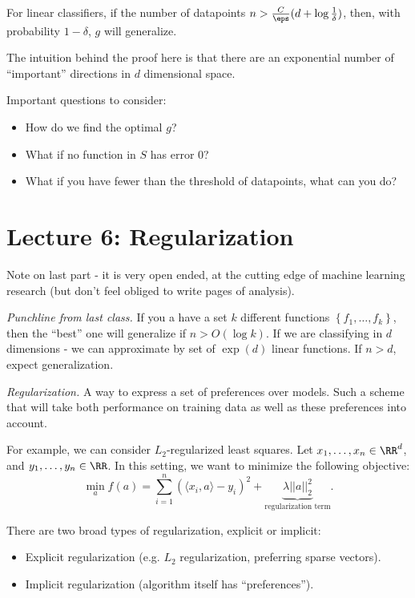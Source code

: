 \begin{theorem}
  For linear classifiers, if the number of datapoints $n > \frac{C}{\eps} (d + \log \frac{1}{\delta})$, then, with probability $1 - \delta$, $g$ will generalize.
\end{theorem}

The intuition behind the proof here is that there are an exponential number of ``important'' directions in $d$ dimensional space.

Important questions to consider:

\begin{itemize}
  \item How do we find the optimal $g$?
  \item What if no function in $S$ has error 0?
  \item What if you have fewer than the threshold of datapoints, what can you do?
\end{itemize}

\section{Lecture 6: Regularization}

Note on last part - it is very open ended, at the cutting edge of machine learning research (but don't feel obliged to write pages of analysis).

{\it Punchline from last class.} If you a have a set $k$ different functions $\left\{ f_1, \dots, f_k \right\}$, then the ``best'' one will generalize if $n > O(\log k)$.  If we are classifying in $d$ dimensions - we can approximate by set of $\exp (d)$ linear functions.  If $n > d$, expect generalization.

{\it Regularization.} A way to express a set of preferences over models.  Such a scheme that will take both performance on training data as well as these preferences into account. \\

\begin{example}
  For example, we can consider $L_2$-regularized least squares.  Let $x_1, \dots, x_n \in \RR^d$, and $y_1, \dots, y_n \in \RR$.  In this setting, we want to minimize the following objective:
  \[
    \min_{a} f(a) = \sum_{i=1}^{n} \left( \langle x_i, a \rangle - y_i \right)^2 + \underbrace{\lambda ||a||_2^{2}}_{\text{regularization term}}.
  \]
\end{example}

There are two broad types of regularization, explicit or implicit:
\begin{itemize}
  \item Explicit regularization (e.g. $L_2$ regularization, preferring sparse vectors).
  \item Implicit regularization (algorithm itself has ``preferences'').
\end{itemize}

